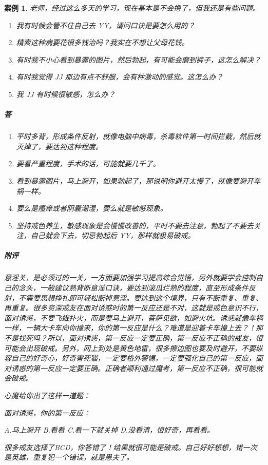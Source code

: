 \documentclass{ctexart}
\newtheorem{case}{案例}
\begin{document}
\begin{case}
    老师，经过这么多天的学习，现在基本是不会撸了，但我还是有些问题。\begin{enumerate}
        \item 我有时候会管不住自己去 YY，请问口诀是要怎么用的？
        \item 精索这种病要花很多钱治吗？我实在不想让父母花钱。
        \item 有时我不小心看到暴露的图片，然后勃起，有可能会磨到裤子，这怎么解决？
        \item 有时我觉得 JJ 那边有点不舒服，会有种激动的感觉。这怎么办？
        \item 我 JJ 有时候很敏感，怎么办？
    \end{enumerate}
    \subparagraph{答} \begin{enumerate}
        \item 平时多背，形成条件反射，就像电脑中病毒，杀毒软件第一时间拦截，然后就灭掉了，要达到这种程度。
        \item 要看严重程度，手术的话，可能就要几千了。
        \item 看到暴露图片，马上避开，如果勃起了，那说明你避开太慢了，就像要避开车祸一样。
        \item 要么是瘙痒或者阴囊潮湿，要么就是敏感现象。
        \item 坚持戒色养生，敏感现象是会慢慢改善的，平时不要去注意，勃起了不要去关注，自己就会下去，切忌勃起后 YY，那样就极易破戒。
    \end{enumerate}
    \subparagraph{附评} 意淫关，是必须过的一关，一方面要加强学习提高综合觉悟，另外就要学会控制自己的念头，一般建议熟背断意淫口诀，要达到滚瓜烂熟的程度，直至形成条件反射，不需要思想挣扎即可轻松断掉意淫。要达到这个境界，只有不断重复、重复、再重复。很多资深戒友在面对诱惑时的第一反应还是不对，这就是戒色意识不行，面对诱惑，不要飞蛾扑火，而是要马上避开，菩萨见欲，如避火坑。诱惑就像车祸一样，一辆大卡车向你撞来，你的第一反应是什么？难道是迎着卡车撞上去？！那不是找死吗？所以，面对诱惑，第一反应一定要正确，第一反应不正确的戒友，很可能会出现破戒。另外，网上到处是黄色地雷，很多擦边图也要及时避开，不要纵容自己的好奇心，好奇害死猫，一定要格外警惕，一定要强化自己的第一反应，面对诱惑的第一反应一定要正确。正确者顺利通过魔考，第一反应不正确，很可能就会破戒。

    心魔给你出了这样一道题：

    \it 面对诱惑，你的第一反应：

    A.马上避开 \hfill B.看看 \hfill C.看一下就关掉 \hfill D.没看清，很好奇，再看看。\rm

    很多戒友选择了BCD，你答错了！结果就很可能是破戒。自己好好想想，错一次是英雄，重复犯一个错误，就是愚夫了。
\end{case}
\end{document}
